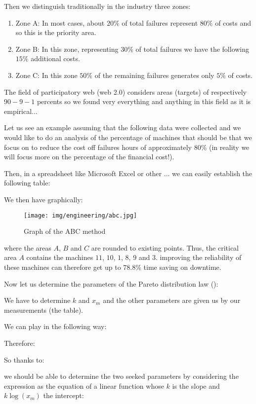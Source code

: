 	Then we distinguish traditionally in the industry three zones:
	\begin{enumerate}
		\item Zone A: In most cases, about $20\%$ of total failures represent $80\%$ of costs and so this is the priority area.
		
		\item Zone B: In this zone, representing $30\%$ of total failures we have the following $15\%$ additional costs.
		
		\item Zone C: In this zone $50\%$ of the remaining failures generates only $5\%$ of costs.
	\end{enumerate}
	The field of participatory web (web 2.0) considers areas (targets) of respectively $90-9-1$ percents so we found very everything and anything in this field as it is empirical...
	
	Let us see an example assuming that the following data were collected and we would like to do an analysis of the percentage of machines that should be that we focus on to reduce the cost off failures hours of approximately $80\%$ (in reality we will focus more on the percentage of the financial cost!).
	
	Then, in a spreadsheet like Microsoft Excel or other ... we can easily establish the following table:
	
	We then have graphically:
	\begin{figure}[H]
		\begin{center}
		\texttt{[image: img/engineering/abc.jpg]}
		\end{center}	
		\caption{Graph of the ABC method}
	\end{figure}
	where the areas $A$, $B$ and $C$ are rounded to existing points. Thus, the critical area $A$ contains the machines $11$, $10$, $1$, $8$, $9$ and $3$. improving the reliability of these machines can therefore get up to $78.8\%$ time saving on downtime.
	
	Now let us determine the parameters of the Pareto distribution law ():
	
We have to determine $k$ and $x_m$ and the other parameters are given us by our measurements (the table).

	We can play in the following way:
	
	Therefore:
	
	So thanks to:
	
	we should be able to determine the two seeked parameters by considering the expression as the equation of a linear function whose $k$ is the slope and $k\log(x_m)$ the intercept:
	
